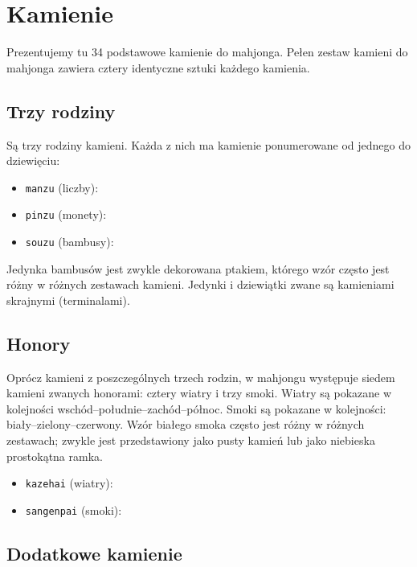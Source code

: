 \section{Kamienie}

Prezentujemy tu 34 podstawowe kamienie do mahjonga. Pełen zestaw kamieni do mahjonga zawiera cztery identyczne sztuki każdego kamienia.

\subsection{Trzy rodziny}

Są trzy rodziny kamieni. Każda z nich ma kamienie ponumerowane od jednego do dziewięciu:

\begin{itemize}
  \item\texttt{manzu} (liczby): 
  \item\texttt{pinzu} (monety): 
  \item\texttt{souzu} (bambusy): 
\end{itemize}

Jedynka bambusów jest zwykle dekorowana ptakiem, którego wzór często jest różny w różnych zestawach kamieni. Jedynki i dziewiątki zwane są kamieniami skrajnymi (terminalami).

\subsection{Honory}

Oprócz kamieni z poszczególnych trzech rodzin, w mahjongu występuje siedem kamieni zwanych honorami: cztery wiatry i trzy smoki. Wiatry są pokazane w kolejności wschód--południe--zachód--północ. Smoki są pokazane w kolejności: biały--zielony--czerwony. Wzór białego smoka często jest różny w różnych zestawach; zwykle jest przedstawiony jako pusty kamień lub jako niebieska prostokątna ramka.

\begin{itemize}
\item\texttt{kazehai} (wiatry): 
\item\texttt{sangenpai} (smoki): 
\end{itemize}

\subsection{Dodatkowe kamienie}

